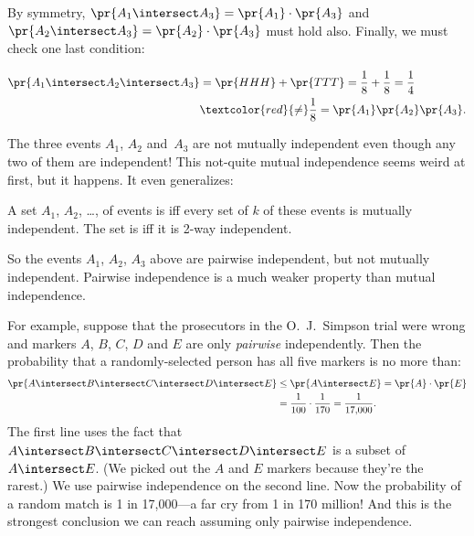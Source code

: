 By symmetry, $\pr{A_1 \intersect A_3} = \pr{A_1} \cdot \pr{A_3}$ and
$\pr{A_2 \intersect A_3} = \pr{A_2} \cdot \pr{A_3}$ must hold also.
Finally, we must check one last condition:

\begin{align*}
\pr{A_1 \intersect A_2 \intersect A_3}
        & = \pr{HHH} + \pr{TTT}
          = \frac{1}{8} + \frac{1}{8}
          = \frac{1}{4}\\
        & \textcolor{red}{\mathbf{\neq}} \frac{1}{8} = \pr{A_1} \pr{A_2} \pr{A_3}.
\end{align*}

%
The three events $A_1$, $A_2$ and~$A_3$ are not mutually independent
even though any two of them are independent!  This not-quite mutual
independence seems weird at first, but it happens.  It even
generalizes:

\begin{definition}\label{kway_independent_events}
  A set $A_1$, $A_2$, \dots, of events is 
  iff every set of $k$ of these events is mutually independent.  The
  set is  iff it is 2-way independent.
\end{definition}

So the events $A_1$, $A_2$, $A_3$ above are pairwise independent, but
not mutually independent.  Pairwise independence is a much weaker
property than mutual independence.

For example, suppose that the prosecutors in the O.~J.~Simpson trial
were wrong and markers $A$, $B$, $C$, $D$ and $E$ are only
\emph{pairwise} independently.  Then the probability that a
randomly-selected person has all five markers is no more than:
%
\begin{align*}
\pr{A \intersect B \intersect C \intersect D \intersect E}
    & \leq \pr{A \intersect E} = \pr{A} \cdot \pr{E}\\
    & = \frac{1}{100} \cdot \frac{1}{170} = \frac{1}{17{,}000}.
\end{align*}
%
The first line uses the fact that $A \intersect B \intersect C \intersect
D \intersect E$ is a subset of $A \intersect E$.  (We picked out the $A$
and $E$ markers because they're the rarest.)  We use pairwise independence
on the second line.  Now the probability of a random match is 1 in
17,000---a far cry from 1 in 170 million!  And this is the strongest
conclusion we can reach assuming only pairwise independence.

